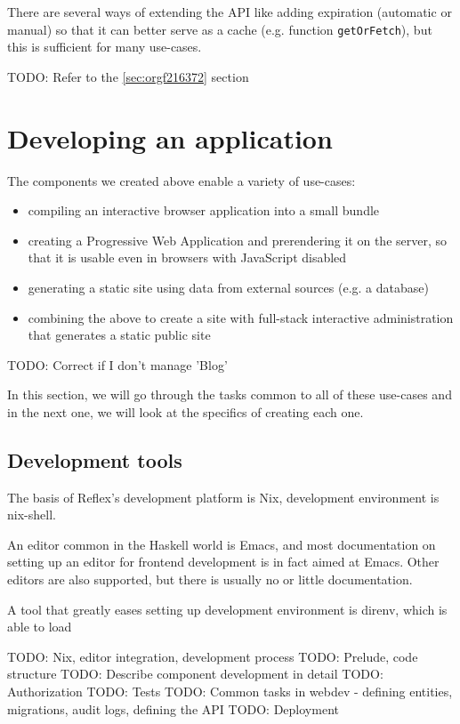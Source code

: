 \documentclass[english,odsaz]{fitthesis}
\begin{document}
There are several ways of extending the API like adding expiration (automatic
or manual) so that it can better serve as a cache (e.g. function \texttt{getOrFetch}),
but this is sufficient for many use-cases.

TODO: Refer to the \ref{sec:orgf216372} section

\chapter{Developing an application}
\label{sec:org4b90b44}
The components we created above enable a variety of use-cases:
\begin{itemize}
\item compiling an interactive browser application into a small bundle
\item creating a Progressive Web Application and prerendering it on the server, so
that it is usable even in browsers with JavaScript disabled
\item generating a static site using data from external sources (e.g. a database)
\item combining the above to create a site with full-stack interactive
administration that generates a static public site
\end{itemize}

TODO: Correct if I don't manage 'Blog'

In this section, we will go through the tasks common to all of these use-cases
and in the next one, we will look at the specifics of creating each one.

\section{Development tools}
\label{sec:orge0a597c}
The basis of Reflex's development platform is Nix, development environment is
nix-shell.

An editor common in the Haskell world is Emacs, and most documentation on
setting up an editor for frontend development is in fact aimed at Emacs. Other
editors are also supported, but there is usually no or little documentation.

A tool that greatly eases setting up development environment is direnv, which is
able to load 

TODO: Nix, editor integration, development process
TODO: Prelude, code structure
TODO: Describe component development in detail
TODO: Authorization
TODO: Tests
TODO: Common tasks in webdev - defining entities, migrations, audit logs, defining the API
TODO: Deployment
\end{document}
